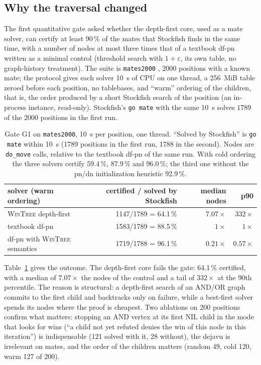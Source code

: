 \documentclass{article}
\theoremstyle{plain}
\theoremstyle{definition}
\theoremstyle{remark}
\newcommand{\NIL}{\ensuremath{\mathrm{NIL}}}
\newcommand{\code}[1]{\texttt{#1}}
\newcommand{\WT}{\textsc{WinTree}}
\begin{document}
\subsection{Why the traversal changed}\label{sec:g1}

The first quantitative gate asked whether the depth-first core, used as a mate solver, can certify at least 90\,\% of the mates that Stockfish finds in the same time, with a number of nodes at most three times that of a textbook df-pn \cite{nagai2002} written as a minimal control (threshold search with $1 + \varepsilon$, its own table, no graph-history treatment). The suite is \code{mates2000} \cite{matetrack}, 2000 positions with a known mate; the protocol gives each solver 10~s of CPU on one thread, a 256~MiB table zeroed before each position, no tablebases, and ``warm'' ordering of the children, that is, the order produced by a short Stockfish search of the position (an in-process instance, read-only). Stockfish's \code{go mate} with the same 10~s solves $1789$ of the $2000$ positions in the first run.

\begin{table}[h]\centering\footnotesize
\begin{tabular}{lrrr}
\toprule
solver (warm ordering) & certified / solved by Stockfish & median nodes & p90 \\
\midrule
\WT{} depth-first & 1147/1789 = 64.1\,\% & $7.07\times$ & $332\times$ \\
textbook df-pn & 1583/1789 = 88.5\,\% & $1\times$ & $1\times$ \\
\midrule
df-pn with \WT{} semantics & 1719/1788 = 96.1\,\% & $0.21\times$ & $0.57\times$ \\
\bottomrule
\end{tabular}
\caption{Gate G1 on \code{mates2000}, 10~s per position, one thread. ``Solved by Stockfish'' is \code{go mate} within 10~s (1789 positions in the first run, 1788 in the second). Nodes are \code{do\_move} calls, relative to the textbook df-pn of the same run. With cold ordering the three solvers certify 59.4\,\%, 87.9\,\% and 96.0\,\%; the third one without the pn/dn initialization heuristic 92.9\,\%.}
\label{tab:g1}
\end{table}

Table~\ref{tab:g1} gives the outcome. The depth-first core fails the gate: 64.1\,\% certified, with a median of $7.07\times$ the nodes of the control and a tail of $332\times$ at the 90th percentile. The reason is structural: a depth-first search of an AND/OR graph commits to the first child and backtracks only on failure, while a best-first solver spends its nodes where the proof is cheapest. Two ablations on 200 positions confirm what matters: stopping an AND vertex at its first \NIL{} child in the mode that looks for wins (``a child not yet refuted denies the win of this node in this iteration'') is indispensable (121 solved with it, 28 without), the dejavu is irrelevant on mates, and the order of the children matters (random 49, cold 120, warm 127 of 200).
\end{document}

